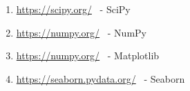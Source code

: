 \begin{enumerate}
\item \url{https://scipy.org/} \ - SciPy
\item \url{https://numpy.org/} \ - NumPy
\item \url{https://numpy.org/} \ - Matplotlib
\item \url{https://seaborn.pydata.org/} \ - Seaborn
\end{enumerate}